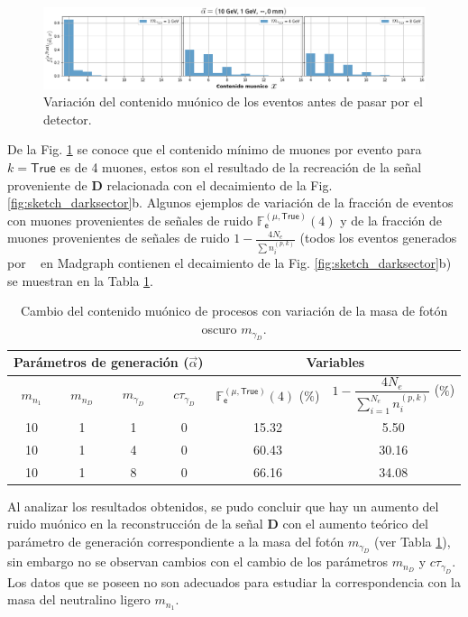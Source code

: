 \begin{figure}[!ht]
\centering
\includegraphics[width=1\textwidth]{Simulacion/imagenes/True_Entries.png}
\caption{Variación del contenido muónico de los eventos antes de pasar por el detector.}
\label{contenido_muonico}
\end{figure}

De la Fig. \ref{contenido_muonico} se conoce que el contenido mínimo de muones por evento para $k=\textsf{True}$ es de 4 muones, estos son el resultado de la recreación de la señal \MC ~ proveniente de \MSSM\textbf{D} relacionada con el decaimiento de la Fig. \ref{fig:sketch_darksector}b. Algunos ejemplos de variación de la fracción de eventos con muones provenientes de señales de ruido $\mathbb{F}^{(\mu, \textsf{True})}_\textsf{e}(4)$ y de la fracción  de muones provenientes de señales de ruido $1- \frac{4 N_e}{\sum n_i^{(p,k)}}$ (todos los eventos generados por \MC ~ en Madgraph contienen el decaimiento de la Fig. \ref{fig:sketch_darksector}b) se muestran en la Tabla \ref{generacion0}.


\begin{table}[!h]
\centering
\begin{tabular}{|cccc|c|c|}
\toprule
\multicolumn{4}{|c|}{Parámetros de generación ($\vec{\alpha}$)} & \multicolumn{2}{|c|}{Variables} \\
\midrule
$m_{n_1}$  & 
$m_{n_D}$ & 
$m_{\gamma_D}$ & %
$c\tau_{\gamma_D}$  & %
$\mathbb{F}^{(\mu, \textsf{True})}_\textsf{e}(4)$ ($\textsf{\%}$)&
$1- \dfrac{4 N_e}{\sum\limits_{i=1}^{N_e} n_i^{(p,k)}}$ ($\textsf{\%}$)\\
\midrule
10 & 1 & 1 & 0 & 15.32 & 5.50 \\
10 & 1 & 4 & 0 & 60.43 & 30.16\\
10 & 1 & 8 & 0 & 66.16 & 34.08\\
\bottomrule 
\end{tabular}%
\caption{Cambio del contenido muónico de procesos con variación de la masa de fotón oscuro $m_{\gamma_D}$.}
\label{generacion0}
\end{table}
Al analizar los resultados obtenidos, se pudo concluir que hay un aumento del ruido muónico en la reconstrucción de la señal \MSSM\textbf{D} con el aumento teórico del parámetro de generación correspondiente a la masa del fotón $m_{\gamma_D}$ (ver Tabla \ref{generacion0}), sin embargo no se observan cambios con el cambio de los parámetros $m_{n_D}$ y $c\tau_{\gamma_D}$. Los datos que se poseen no son adecuados para estudiar la correspondencia con la masa del neutralino ligero $m_{n_1}$.

